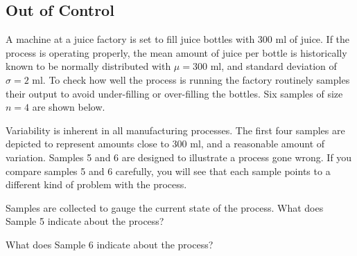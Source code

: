 \documentclass{ximera}
\begin{document}
\subsection*{Out of Control}

\begin{exploration}\label{exp:OJ}
  A machine at a juice factory is set to fill juice bottles with 300 ml of juice.  If the process is operating properly, the mean amount of juice per bottle is historically known to be normally distributed with $\mu=300$ ml, and standard deviation of $\sigma=2$ ml. To check how well the process is running the factory routinely samples their output to avoid under-filling or over-filling the bottles.  Six samples of size $n=4$ are shown below.

\begin{center}
      \end{center}

Variability is inherent in all manufacturing processes.  The first four samples are depicted to represent amounts close to 300 ml, and a reasonable amount of variation.  Samples 5 and 6 are designed to illustrate a process gone wrong.  If you compare samples 5 and 6 carefully, you will see that each sample points to a different kind of problem with the process.

Samples are collected to gauge the current state of the process.  What does Sample 5 indicate about the process?

\begin{multipleChoice}
\end{multipleChoice}

What does Sample 6 indicate about the process?

\begin{multipleChoice}
\end{multipleChoice}
 \end{exploration}
\end{document}

